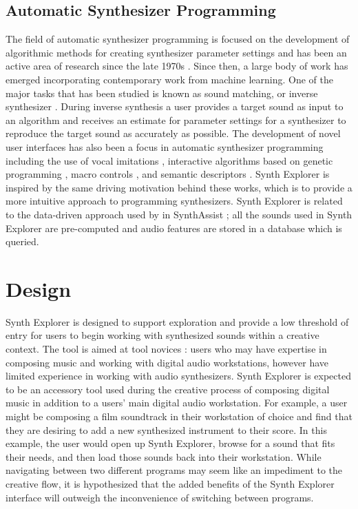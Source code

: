 \subsection{Automatic Synthesizer Programming}
The field of automatic synthesizer programming is focused on the development of algorithmic methods for creating synthesizer parameter settings and has been an active area of research since the late 1970s \cite{justice1979analytic}. Since then, a large body of work has emerged incorporating contemporary work from machine learning. One of the major tasks that has been studied is known as sound matching, or inverse synthesizer \cite{yee2018automatic}. During inverse synthesis a user provides a target sound as input to an algorithm and receives an estimate for parameter settings for a synthesizer to reproduce the target sound as accurately as possible. The development of novel user interfaces has also been a focus in automatic synthesizer programming including the use of vocal imitations \cite{cartwright2014synthassist}, interactive algorithms based on genetic programming \cite{yee2016use}, macro controls \cite{esling2019universal}, and semantic descriptors \cite{seago2013new}. Synth Explorer is inspired by the same driving motivation behind these works, which is to provide a more intuitive approach to programming synthesizers. Synth Explorer is related to the data-driven approach used by in SynthAssist \cite{cartwright2014synthassist}; all the sounds used in Synth Explorer are pre-computed and audio features are stored in a database which is queried.

\section{Design}
Synth Explorer is designed to support exploration and provide a low threshold of entry for users to begin working with synthesized sounds within a creative context. The tool is aimed at tool novices \cite{davis2013toward}: users who may have expertise in composing music and working with digital audio workstations, however have limited experience in working with audio synthesizers. Synth Explorer is expected to be an accessory tool used during the creative process of composing digital music in addition to a users' main digital audio workstation. For example, a user might be composing a film soundtrack in their workstation of choice and find that they are desiring to add a new synthesized instrument to their score. In this example, the user would open up Synth Explorer, browse for a sound that fits their needs, and then load those sounds back into their workstation. While navigating between two different programs may seem like an impediment to the creative flow, it is hypothesized that the added benefits of the Synth Explorer interface will outweigh the inconvenience of switching between programs.

